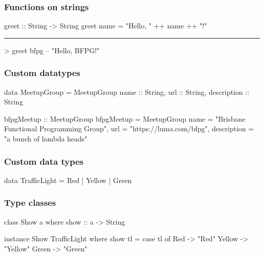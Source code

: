 \documentclass[UKenglish,usenames,dvipsnames,svgnames,table,aspectratio=169,mathserif]{beamer}
\begin{document}
\begin{frame}[fragile]
\frametitle{Functions on strings}
\begin{center}
\begin{minipage}{0.6\textwidth}
\begin{haskellcode}
greet :: String -> String
greet name = "Hello, " ++ name ++ "!"

\end{haskellcode}
\pause
\hrule
\begin{haskellcode}

> greet bfpg
-- "Hello, BFPG!"
\end{haskellcode}
\end{minipage}
\end{center}
\end{frame}


\begin{frame}[fragile]
\frametitle{Custom datatypes}
\begin{center}
\begin{minipage}{0.6\textwidth}
\begin{haskellcode}
data MeetupGroup =
  MeetupGroup {
    name :: String,
    url :: String,
    description :: String
  }
\end{haskellcode}
\pause
\begin{haskellcode}
bfpgMeetup :: MeetupGroup
bfpgMeetup =
  MeetupGroup {
    name = "Brisbane Functional Programming Group",
    url = "https://luma.com/bfpg",
    description = "a bunch of lambda heads"
  }
\end{haskellcode}
\end{minipage}
\end{center}
\end{frame}


\begin{frame}[fragile]
\frametitle{Custom data types}
\begin{center}
\begin{minipage}{0.6\textwidth}
\begin{haskellcode}
data TrafficLight
  = Red
  | Yellow
  | Green
\end{haskellcode}
\end{minipage}
\end{center}
\end{frame}


\begin{frame}[fragile]
\frametitle{Type classes}
\begin{center}
\begin{minipage}{0.6\textwidth}
\begin{haskellcode}
class Show a where
  show :: a -> String

\end{haskellcode}
\pause
\begin{haskellcode}
instance Show TrafficLight where
  show tl =
    case tl of
      Red -> "Red"
      Yellow -> "Yellow"
      Green -> "Green"
\end{haskellcode}
\end{minipage}
\end{center}
\end{frame}
\end{document}
